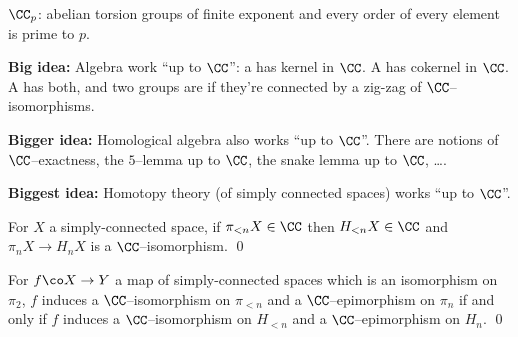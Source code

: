\begin{example}
$\CC_p$: abelian torsion groups of finite exponent and every order of every element is prime to $p$.
\end{example}

\textbf{Big idea:} Algebra work ``up to $\CC$'': a  has kernel in $\CC$.  A  has cokernel in $\CC$.  A  has both, and two groups are  if they're connected by a zig-zag of $\CC$--isomorphisms.

\textbf{Bigger idea:} Homological algebra also works ``up to $\CC$''.  There are notions of $\CC$--exactness, the $5$--lemma up to $\CC$, the snake lemma up to $\CC$, \ldots .

\textbf{Biggest idea:} Homotopy theory (of simply connected spaces) works ``up to $\CC$''.

\begin{theorem}[Hurewicz]
For $X$ a simply-connected space, if $\pi_{< n} X \in \CC$ then $H_{< n} X \in \CC$ and $\pi_n X \to H_n X$ is a $\CC$--isomorphism. \qed
\end{theorem}

\begin{theorem}[Whitehead]
For $f\co X \to Y$ a map of simply-connected spaces which is an isomorphism on $\pi_2$, $f$ induces a $\CC$--isomorphism on $\pi_{< n}$ and a $\CC$--epimorphism on $\pi_n$ if and only if $f$ induces a $\CC$--isomorphism on $H_{< n}$ and a $\CC$--epimorphism on $H_n$. \qed
\end{theorem}

